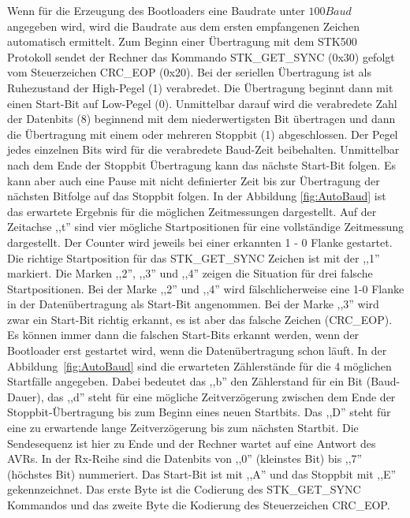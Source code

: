 Wenn für die Erzeugung des Bootloaders eine Baudrate unter \(100Baud\)
angegeben wird, wird die Baudrate aus dem ersten empfangenen Zeichen
automatisch ermittelt.
Zum Beginn einer Übertragung mit dem STK500 Protokoll sendet der Rechner
das Kommando STK\_GET\_SYNC (0x30) gefolgt vom Steuerzeichen CRC\_EOP (0x20).
Bei der seriellen Übertragung ist als Ruhezustand der High-Pegel (1)
verabredet. Die Übertragung beginnt dann mit einen Start-Bit auf Low-Pegel (0).
Unmittelbar darauf wird die verabredete Zahl der Datenbits (8) beginnend
mit dem niederwertigsten Bit übertragen und dann die Übertragung mit einem oder
mehreren Stoppbit (1) abgeschlossen. 
Der Pegel jedes einzelnen Bits wird für die verabredete Baud-Zeit beibehalten.
Unmittelbar nach dem Ende der Stoppbit Übertragung kann das nächste Start-Bit
folgen. Es kann aber auch eine Pause mit nicht definierter Zeit bis zur 
Übertragung der nächsten Bitfolge auf das Stoppbit folgen. 
In der Abbildung \ref{fig:AutoBaud} ist das erwartete Ergebnis für die möglichen
Zeitmessungen dargestellt. Auf der Zeitachse ,,t'' sind vier mögliche Startpositionen
für eine vollständige Zeitmessung dargestellt. Der Counter wird jeweils
bei einer erkannten 1 - 0 Flanke gestartet. Die richtige Startposition
für das STK\_GET\_SYNC Zeichen ist mit der ,,1'' markiert.
Die Marken ,,2'', ,,3'' und ,,4'' zeigen die Situation für drei falsche Startpositionen.
Bei der Marke ,,2'' und ,,4'' wird fälschlicherweise eine 1-0 Flanke in der
Datenübertragung als Start-Bit angenommen. Bei der Marke ,,3'' wird zwar
ein Start-Bit richtig erkannt, es ist aber das falsche Zeichen (CRC\_EOP).
Es können immer dann die falschen Start-Bits erkannt werden, wenn der Bootloader
erst gestartet wird, wenn die Datenübertragung schon läuft.
In der Abbildung~\ref{fig:AutoBaud} sind die erwarteten Zählerstände für die
4 möglichen Startfälle angegeben. Dabei bedeutet das ,,b'' den Zählerstand
für ein Bit (Baud-Dauer), das ,,d'' steht für eine mögliche Zeitverzögerung
zwischen dem Ende der Stoppbit-Übertragung bis zum Beginn eines neuen Startbits.
Das ,,D'' steht für eine zu erwartende lange Zeitverzögerung bis zum nächsten
Startbit. Die Sendesequenz ist hier zu Ende und der Rechner wartet auf eine
Antwort des AVRs.
In der Rx-Reihe sind die Datenbits von ,,0'' (kleinstes Bit) bis ,,7'' (höchstes Bit)
nummeriert. Das Start-Bit ist mit ,,A'' und das Stoppbit mit ,,E'' gekennzeichnet.
Das erste Byte ist die Codierung des STK\_GET\_SYNC Kommandos und das zweite Byte
die Kodierung des Steuerzeichen CRC\_EOP.


